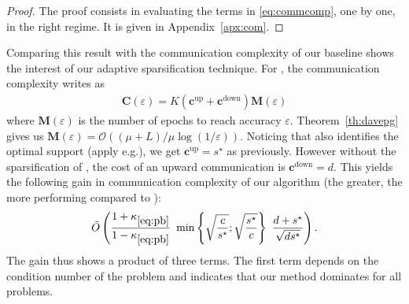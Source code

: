 \begin{proof}
The proof consists in evaluating the terms in \eqref{eq:commcomp}, one by one, in the right regime. It is given in Appendix~\ref{apx:com}.
\end{proof}

Comparing this result with the communication complexity of our baseline \dave shows the interest of our adaptive sparsification technique. For \dave, the communication complexity writes as 
\begin{align*}%
    \mathbf{C}(\varepsilon) = K( \mathbf{c}^{\mathrm{up}} + \mathbf{c}^{\mathrm{down}} ) \mathbf{M}(\varepsilon) 
\end{align*}
where $\mathbf{M}(\varepsilon)$ is the number of epochs to reach accuracy $\varepsilon$. Theorem~\ref{th:davepg} gives us  $\mathbf{M}(\varepsilon) = \mathcal{O}((\mu+L)/\mu\log(1/\varepsilon))$. 
Noticing that \dave also identifies the optimal support (apply e.g.\;\cite[Cor.]{iutzeler2020SVAA}),
we get $\mathbf{c^{\mathrm{up}}} = s^\star$ as previously. However without the sparsification of \salgo, the cost of an upward communication is $\mathbf{c^{\mathrm{down}}} = d$. This yields the following gain in communication complexity of our algorithm %
(the greater, the more performing \recoalgo compared to \dave):
\begin{align*}
      \tilde{O}\left( \frac{1+\kappa_{\eqref{eq:pb}}}{1-\kappa_{\eqref{eq:pb}}}   ~ \min \left\{\sqrt{\frac{c}{s^\star}};\sqrt{\frac{s^\star}{c}} \right\} ~ \frac{d+s^\star}{\sqrt{ds^\star}}  \right).
\end{align*}
The gain thus shows a product of three terms. 
The first term depends on the condition number of the problem and indicates that our method dominates \dave for all problems.
